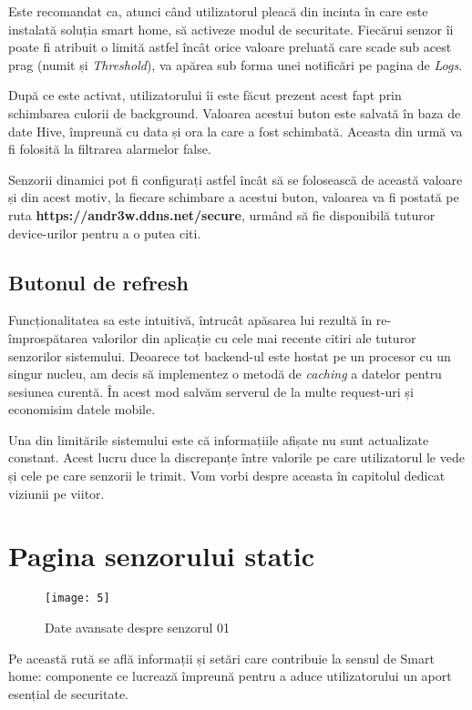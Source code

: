 Este recomandat ca, atunci când utilizatorul pleacă din incinta în care este instalată soluția smart home, să activeze modul de securitate. Fiecărui senzor îi poate fi atribuit o limită astfel încât orice valoare preluată  care scade sub acest prag (numit și \emph{Threshold}), va apărea sub forma unei notificări pe pagina de \emph{Logs}.

După ce este activat, utilizatorului îi este făcut prezent acest fapt prin schimbarea culorii de background. Valoarea acestui buton este salvată în baza de date Hive, împreună cu data și ora la care a fost schimbată. Aceasta din urmă va fi folosită la filtrarea alarmelor false.

Senzorii dinamici pot fi configurați astfel încât să se folosească de această valoare și din acest motiv, la fiecare schimbare a acestui buton, valoarea va fi postată pe ruta \textbf{https://andr3w.ddns.net/secure}, urmând să fie disponibilă tuturor device-urilor pentru a o putea citi.

\subsection{Butonul de refresh}

Funcționalitatea sa este intuitivă, întrucât apăsarea lui rezultă în re-împrospătarea valorilor din aplicație cu cele mai recente citiri ale tuturor senzorilor sistemului. Deoarece tot backend-ul este hostat pe un procesor cu un singur nucleu, am decis să implementez o metodă de \emph{caching} a datelor pentru sesiunea curentă. În acest mod salvăm serverul de la multe request-uri și economisim datele mobile.

Una din limitările sistemului este că informațiile afișate nu sunt actualizate constant. Acest lucru duce la discrepanțe între valorile pe care utilizatorul le vede și cele pe care senzorii le trimit. Vom vorbi despre aceasta în capitolul dedicat viziunii pe viitor.

\break

\section{Pagina senzorului static}

\begin{wrapfigure}{r}{0.3\textwidth}
	\texttt{[image: 5]}
	\caption{Date avansate despre senzorul 01}
	\label{fig:5}
\end{wrapfigure}

Pe această rută se află informații și setări care contribuie la sensul de Smart home: componente ce lucrează împreună pentru a aduce utilizatorului un aport esențial de securitate.

